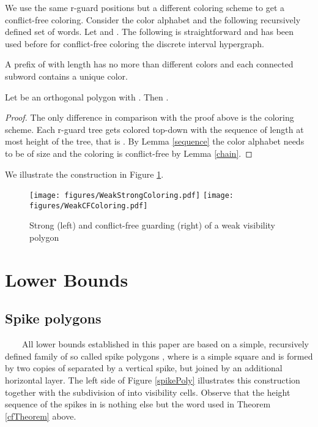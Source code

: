 \documentclass[a4paper,USenglish,numberwithinsect]{lipics}
\theoremstyle{plain}
\begin{document}
We use the same r-guard positions but a different coloring scheme to get a
conflict-free coloring. Consider the color alphabet  and the following recursively defined set of words. Let 
and . The following is straightforward
and has been used before for conflict-free coloring the discrete
interval hypergraph.
\begin{lemma}
\label{sequence}
A prefix of  with length  has no more than
 different colors and each connected subword contains a unique color.
\end{lemma}



\begin{theorem}
\label{cfTheorem}
Let  be an orthogonal polygon with . Then 
 .
\end{theorem}

\begin{proof}
The only difference in comparison with the proof above is the coloring
scheme. Each r-guard tree gets colored top-down with the sequence  of
length at most height of the tree, that is . By Lemma
\ref{sequence} the color alphabet needs to be of size
 and the coloring is conflict-free by Lemma \ref{chain}.
\end{proof}

We illustrate the construction in Figure \ref{coveringGuards}.
\begin{figure}
\centering
\texttt{[image: figures/WeakStrongColoring.pdf]}\quad\quad
\texttt{[image: figures/WeakCFColoring.pdf]}
\caption{Strong (left)  and conflict-free guarding (right) of a  weak visibility
polygon}
\label{coveringGuards}
\end{figure}

\section{Lower Bounds}


\subsection{Spike polygons}
\ \ \ \ All lower bounds established in this paper are based on a simple,
recursively defined family of so called
spike polygons , where  is a simple square and  is
formed by two copies of
 separated by a vertical spike, but joined by an additional
horizontal layer.
The left side of Figure \ref{spikePoly}  illustrates this construction
together
with the subdivision of  into visibility cells. Observe that the
height sequence of the
spikes in  is nothing else but the word  used in Theorem \ref{cfTheorem} above.
\end{document}

